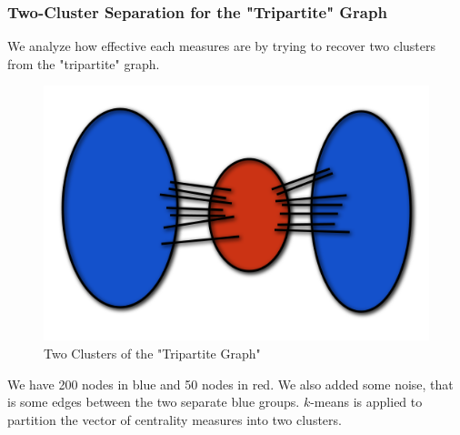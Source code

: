 \documentclass{beamer}
\begin{document}
\begin{frame}
     \frametitle{Two-Cluster Separation for the "Tripartite" Graph}
We analyze how effective each measures are by trying to recover two clusters from the "tripartite" graph.
\begin{figure}
\centering
\includegraphics[width = .40\columnwidth]{twocluster.png}
\caption{Two Clusters of the "Tripartite Graph"}
\label{fig:my_label}
\end{figure}
We have 200 nodes in blue and 50 nodes in red. We also added some noise, that is some edges between the two separate blue groups. $k$-means is applied to partition the vector of centrality measures into two clusters.
\end{frame}
\end{document}
